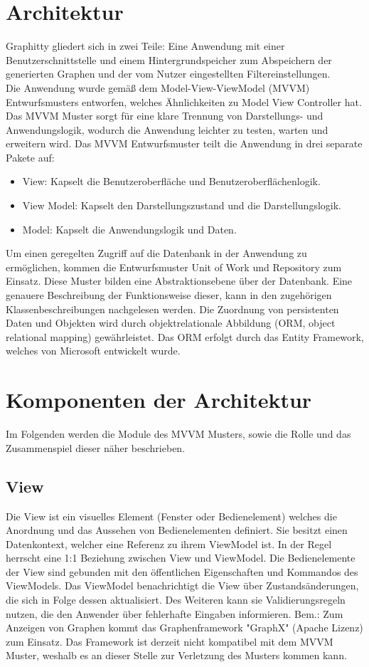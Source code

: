 \documentclass[13pt]{scrreprt}
\begin{document}
\section{Architektur}
	Graphitty gliedert sich in zwei Teile: Eine Anwendung mit einer Benutzerschnittstelle und einem Hintergrundspeicher 		zum Abspeichern der generierten Graphen und der vom Nutzer eingestellten Filtereinstellungen. \\
	Die Anwendung wurde gem\"aß dem Model-View-ViewModel (MVVM) Entwurfsmusters entworfen, welches 			\"Ahnlichkeiten zu Model View Controller hat. Das MVVM Muster sorgt f\"ur eine klare Trennung von Darstellungs- 		und Anwendungslogik, wodurch die Anwendung leichter zu testen, warten und erweitern wird. Das MVVM 			Entwurfsmuster teilt die Anwendung in drei separate Pakete auf:
	\begin{itemize}
		\item View: Kapselt die Benutzeroberfläche und Benutzeroberflächenlogik.
		\item View Model: Kapselt den Darstellungszustand und die Darstellungslogik.
		\item Model: Kapselt die Anwendungslogik und Daten. \\
	\end{itemize}
	Um einen geregelten Zugriff auf die Datenbank in der Anwendung zu ermöglichen, kommen die Entwurfsmuster Unit of Work und Repository zum Einsatz. Diese Muster bilden eine Abstraktionsebene über der 	Datenbank. Eine genauere Beschreibung der Funktionsweise dieser, kann in den zugehörigen Klassenbeschreibungen nachgelesen werden.
	\newline 
	Die Zuordnung von persistenten Daten und Objekten wird durch objektrelationale Abbildung (ORM, object relational 		mapping) gewährleistet. Das ORM erfolgt durch das Entity Framework, welches von Microsoft entwickelt wurde. 	
		
\section{Komponenten der Architektur}
	Im Folgenden werden die Module des MVVM Musters, sowie die Rolle und das Zusammenspiel dieser näher 			beschrieben.
	\subsection{View}
	Die View ist ein visuelles Element (Fenster oder Bedienelement) welches die Anordnung und das Aussehen von 		Bedienelementen definiert. Sie besitzt einen Datenkontext, welcher eine Referenz zu ihrem ViewModel ist. In der 		Regel herrscht eine 1:1 Beziehung zwischen View und ViewModel. Die Bedienelemente der View sind gebunden mit 	den \"offentlichen Eigenschaften und Kommandos des ViewModels. Das ViewModel benachrichtigt die View über 		Zustands\"anderungen, die sich in Folge dessen aktualisiert. Des Weiteren kann sie Validierungsregeln nutzen, die 		den Anwender \"uber  fehlerhafte Eingaben informieren.
	\newline
	Bem.: Zum Anzeigen von Graphen kommt das Graphenframework "GraphX" (Apache Lizenz) zum Einsatz. Das 		Framework ist derzeit nicht kompatibel mit dem MVVM Muster, weshalb es an dieser Stelle zur Verletzung des 		Musters kommen kann.
\end{document}
